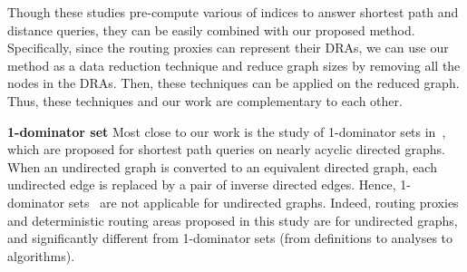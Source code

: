 Though these studies pre-compute various of indices to answer shortest path and distance queries, they can be easily combined with our proposed method. Specifically, since the routing proxies can represent their DRAs, we can use our method as a data reduction technique and reduce graph sizes by removing all the nodes in the DRAs. Then, these techniques can be applied on the reduced graph. Thus, these techniques and our work are complementary to each other.

\smallskip\noindent\textbf{1-dominator set} Most close to our work is the study of 1-dominator sets in~\cite{SaundersT07}, which are proposed for shortest path queries on nearly acyclic directed graphs. When an undirected graph is converted to an equivalent directed graph, each undirected edge is replaced by a pair of inverse directed edges. Hence, 1-dominator sets~\cite{SaundersT07} are not applicable for undirected graphs. Indeed, routing proxies and deterministic routing areas proposed in this study  are for undirected graphs,  and  significantly different from 1-dominator sets (from definitions to analyses to algorithms).






